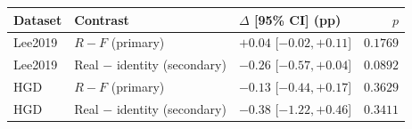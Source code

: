 \begin{tabular}{@{}lllr@{}}
\toprule
Dataset & Contrast & $\Delta$ [95\% CI] (pp) & $p$ \\
\midrule
Lee2019 & $R-F$ (primary) & $+0.04$ [$ -0.02, +0.11 $] & $0.1769$ \\
Lee2019 & Real $-$ identity (secondary) & $-0.26$ [$ -0.57, +0.04 $] & $0.0892$ \\
HGD & $R-F$ (primary) & $-0.13$ [$ -0.44, +0.17 $] & $0.3629$ \\
HGD & Real $-$ identity (secondary) & $-0.38$ [$ -1.22, +0.46 $] & $0.3411$ \\
\bottomrule
\end{tabular}
